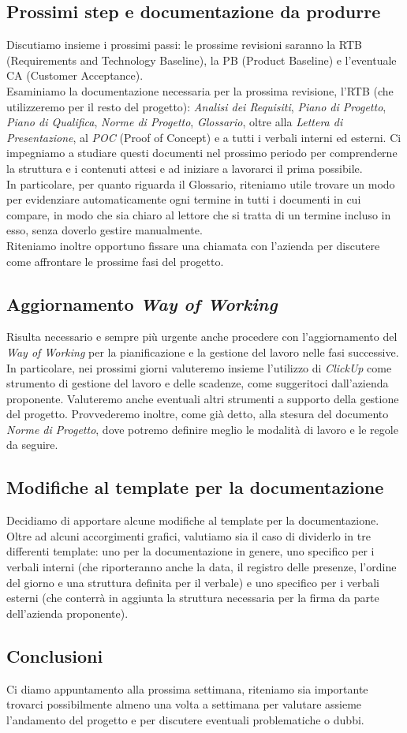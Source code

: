 \documentclass[italian,12pt]{article} %
\begin{document}
\subsection{Prossimi step e documentazione da produrre}
Discutiamo insieme i prossimi passi: le prossime revisioni saranno la RTB (Requirements and Technology Baseline), la PB (Product Baseline) e l'eventuale CA (Customer Acceptance).\\
Esaminiamo la documentazione necessaria per la prossima revisione, l'RTB (che utilizzeremo per il resto del progetto): \textit{Analisi dei Requisiti}, \textit{Piano di Progetto}, \textit{Piano di Qualifica}, \textit{Norme di Progetto}, \textit{Glossario},  oltre alla \textit{Lettera di Presentazione}, al \textit{POC} (Proof of Concept) e a tutti i verbali interni ed esterni. Ci impegniamo a studiare questi documenti nel prossimo periodo per comprenderne la struttura e i contenuti attesi e ad iniziare a lavorarci il prima possibile. \\
In particolare, per quanto riguarda il Glossario, riteniamo utile trovare un modo per evidenziare automaticamente ogni termine in tutti i documenti in cui compare, in modo che sia chiaro al lettore che si tratta di un termine incluso in esso, senza doverlo gestire manualmente. \\
Riteniamo inoltre opportuno fissare una chiamata con l'azienda per discutere come affrontare le prossime fasi del progetto.

\subsection{Aggiornamento \textit{Way of Working}}
Risulta necessario e sempre più urgente anche procedere con l'aggiornamento del \textit{Way of Working} per la pianificazione e la gestione del lavoro nelle fasi successive. \\
In particolare, nei prossimi giorni valuteremo insieme l'utilizzo di \textit{ClickUp} come strumento di gestione del lavoro e delle scadenze, come suggeritoci dall'azienda proponente. Valuteremo anche eventuali altri strumenti a supporto della gestione del progetto. Provvederemo inoltre, come già detto, alla stesura del documento \textit{Norme di Progetto}, dove potremo definire meglio le modalità di lavoro e le regole da seguire.

\subsection{Modifiche al template per la documentazione}
Decidiamo di apportare alcune modifiche al template per la documentazione. \\
Oltre ad alcuni accorgimenti grafici, valutiamo sia il caso di dividerlo in tre differenti template: uno per la documentazione in genere, uno specifico per i verbali interni (che riporteranno anche la data, il registro delle presenze, l'ordine del giorno e una struttura definita per il verbale) e uno specifico per i verbali esterni (che conterrà in aggiunta la struttura necessaria per la firma da parte dell'azienda proponente).

\subsection{Conclusioni}
Ci diamo appuntamento alla prossima settimana, riteniamo sia importante trovarci possibilmente almeno una volta a settimana per valutare assieme l'andamento del progetto e per discutere eventuali problematiche o dubbi.
\end{document}
